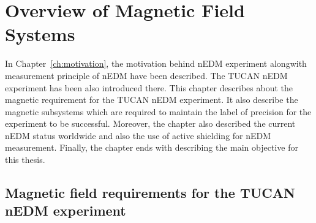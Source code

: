 \chapter{Overview of Magnetic Field Systems}\label{ch:magnetics}



In Chapter~\ref{ch:motivation}, the motivation behind nEDM experiment alongwith measurement principle of nEDM have been described. The TUCAN nEDM experiment has been also introduced there. This chapter describes about the magnetic requirement for the TUCAN nEDM experiment. It also describe the magnetic subsystems which are required to maintain the label of precision for the experiment to be successful. Moreover, the chapter also described the current nEDM status worldwide and also the use of active shielding for nEDM measurement. Finally, the chapter ends with  describing the main objective for this thesis. 

 \section{Magnetic field requirements for the TUCAN nEDM experiment}\label{sec:msr}

